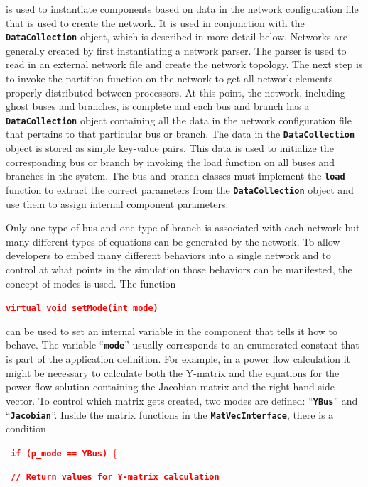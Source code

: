 \documentclass[12pt]{report} %
\begin{document}
is used to instantiate components based on data in the network configuration file that is used to create the network. It is used in conjunction with the \texttt{\textbf{DataCollection}} object, which is described in more detail below. Networks are generally created by first instantiating a network parser. The parser is used to read in an external network file and create the network topology. The next step is to invoke the partition function on the network to get all network elements properly distributed between processors. At this point, the network, including ghost buses and branches, is complete and each bus and branch has a \texttt{\textbf{DataCollection}} object containing all the data in the network configuration file that pertains to that particular bus or branch. The data in the \texttt{\textbf{DataCollection}} object is stored as simple key-value pairs. This data is used to initialize the corresponding bus or branch by invoking the load function on all buses and branches in the system. The bus and branch classes must implement the \texttt{\textbf{load}} function to extract the correct parameters from the \texttt{\textbf{DataCollection}} object and use them to assign internal component parameters.

Only one type of bus and one type of branch is associated with each network but many different types of equations can be generated by the network. To allow developers to embed many different behaviors into a single network and to control at what points in the simulation those behaviors can be manifested, the concept of modes is used. The function

\textcolor{red}{\texttt{\textbf{virtual void setMode(int mode)}}}

can be used to set an internal variable in the component that tells it how to behave. The variable ``\texttt{\textbf{mode}}'' usually corresponds to an enumerated constant that is part of the application definition. For example, in a power flow calculation it might be necessary to calculate both the Y-matrix and the equations for the power flow solution containing the Jacobian matrix and the right-hand side vector. To control which matrix gets created, two modes are defined: ``\texttt{\textbf{YBus}}'' and ``\texttt{\textbf{Jacobian}}''. Inside the matrix functions in the \texttt{\textbf{MatVecInterface}}, there is a condition

\textcolor{red}{\texttt{\textbf{    if (p\_mode == YBus) $\boldsymbol{\mathrm{\{}}$}}}

\textcolor{red}{\texttt{\textbf{      // Return values for Y-matrix calculation}}}
\end{document}
